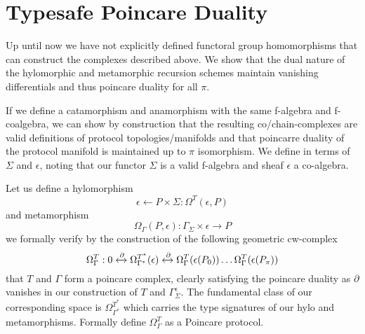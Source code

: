 \documentclass{article}
\begin{document}
\section{Typesafe Poincare Duality}
Up until now we have not explicitly defined functoral group homomorphisms that can construct the complexes described above. We show that the dual nature of the hylomorphic and metamorphic recursion schemes maintain vanishing differentials and thus poincare duality for all $\pi$.

If we define a catamorphism and anamorphism with the same f-algebra and f-coalgebra, we can show by construction that the resulting co/chain-complexes are valid definitions of protocol topologies/manifolds and that poincarre duality of the protocol manifold is maintained up to $\pi$ isomorphism. We define in terms of $\Sigma$ and $\epsilon$, noting that our functor $\Sigma$ is a valid f-algebra and sheaf $\epsilon$ a co-algebra.

Let us define a hylomorphism
\begin{equation} \label{eq1}
\epsilon \leftarrow P \times \Sigma  : \Omega^T(\epsilon, P)
\end{equation} \label{eq1}
and metamorphism
\begin{equation} \label{eq1}
\Omega_\Gamma(P, \epsilon):\Gamma_\Sigma \times \epsilon \rightarrow P  
\end{equation} \label{eq1}
we formally verify by the construction of the following geometric cw-complex
\begin{equation} \label{eq1}
\Omega^T_\Gamma: 0 \xleftrightarrow{\partial} \Omega^{T^*}_{\Gamma^*}(\epsilon) \xleftrightarrow{\partial}  \Omega^T_\Gamma (\epsilon(P_0)) \dots \Omega^T_\Gamma (\epsilon(P_\pi))
\end{equation} \label{eq1}
that $T$ and $\Gamma$ form a poincare complex, clearly satisfying the poincare duality as $\partial$ vanishes in our construction of $T$ and $\Gamma^\epsilon_\Sigma$. The fundamental class of our corresponding space is $\Omega^{T^*}_{\Gamma^*}$ which carries the type signatures of our hylo and metamorphisms. Formally define $\Omega^{T}_{\Gamma}$  as a Poincare protocol.
\end{document}
